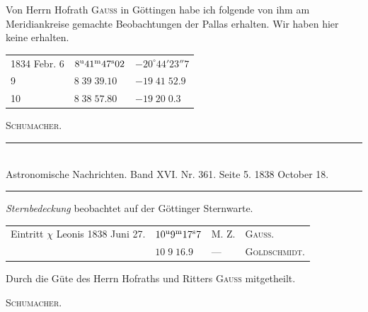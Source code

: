 Von Herrn Hofrath \textsc{Gauss} in Göttingen habe ich folgende von ihm am Meridiankreise gemachte Beobachtungen der Pallas erhalten. Wir haben hier keine erhalten.

\begin{center}
\begin{tabular}{l|l|l}
1834 Febr. 6 & $8^{\rm u}41^{\rm m}47^{\rm s}02$ & $-20^\circ44'23''7$ \\
\hfill 9 & $8\;39\;39.10$ & $-19\;41\;52.9$ \\
\hfill 10 & $8\;38\;57.80$ & $-19\;20\;0.3$ \\
\end{tabular}
\end{center}
\begin{flushright}\textsc{Schumacher.}\end{flushright}

\clearpage
\hypertarget{native-468-occultation}{}
\begin{center}
\rule{0.55\linewidth}{0.4pt}\\[2pt]
Astronomische Nachrichten. Band XVI. Nr. 361. Seite 5. 1838 October 18.\\[2pt]
\rule{0.55\linewidth}{0.4pt}
\end{center}

\begin{center}\emph{Sternbedeckung} beobachtet auf der Göttinger Sternwarte.\end{center}

\begin{center}
\begin{tabular}{llll}
Eintritt $\chi$ Leonis 1838 Juni 27. & $10^{\rm u}9^{\rm m}17^{\rm s}7$ & M. Z. & \textsc{Gauss.} \\
 & $10\;9\;16.9$ & --- & \textsc{Goldschmidt.} \\
\end{tabular}
\end{center}

Durch die Güte des Herrn Hofraths und Ritters \textsc{Gauss} mitgetheilt.
\begin{flushright}\textsc{Schumacher.}\end{flushright}

